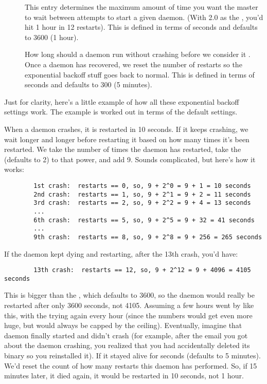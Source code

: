 \begin{description}
\item[]
  \label{param:MasterBackoffCeiling} This entry determines the maximum
  amount of time you want the master to wait between attempts to start
  a given daemon.  (With 2.0 as the ,
  you'd hit 1 hour in 12 restarts).  This is defined in terms of
  seconds and defaults to 3600 (1 hour).

\item[]
  \label{param:MasterRecoverFactor}  How long should a daemon run
  without crashing before we consider it .  Once a
  daemon has recovered, we reset the number of restarts so the
  exponential backoff stuff goes back to normal.  This is defined in
  terms of seconds and defaults to 300 (5 minutes).

\end{description}

Just for clarity, here's a little example of how all these exponential
backoff settings work.  The example is worked out in terms of the
default settings.

When a daemon crashes, it is restarted in 10 seconds.  If it keeps
crashing, we wait longer and longer before restarting it based on how
many times it's been restarted.  We take the number of times the
daemon has restarted, take the 
(defaults to 2) to that power, and add 9.  Sounds complicated, but
here's how it works:
\begin{verbatim}
        1st crash:  restarts == 0, so, 9 + 2^0 = 9 + 1 = 10 seconds
        2nd crash:  restarts == 1, so, 9 + 2^1 = 9 + 2 = 11 seconds
        3rd crash:  restarts == 2, so, 9 + 2^2 = 9 + 4 = 13 seconds
        ...
        6th crash:  restarts == 5, so, 9 + 2^5 = 9 + 32 = 41 seconds
        ...
        9th crash:  restarts == 8, so, 9 + 2^8 = 9 + 256 = 265 seconds
\end{verbatim}

If the daemon kept dying and restarting, after the 13th crash, you'd
have:
\begin{verbatim}
        13th crash:  restarts == 12, so, 9 + 2^12 = 9 + 4096 = 4105 seconds
\end{verbatim}

This is bigger than the , which
defaults to 3600, so the daemon would really be restarted after only
3600 seconds, not 4105.  Assuming a few hours went by like this, with
the  trying again every hour (since the numbers would
get even more huge, but would always be capped by the ceiling).
Eventually, imagine that daemon finally started and didn't crash (for
example, after the email you got about the daemon crashing, you
realized that you had accidentally deleted its binary so you
reinstalled it).  If it stayed alive for
 seconds (defaults to 5 minutes).  We'd
reset the count of how many restarts this daemon has performed.  So,
if 15 minutes later, it died again, it would be restarted in 10
seconds, not 1 hour.

